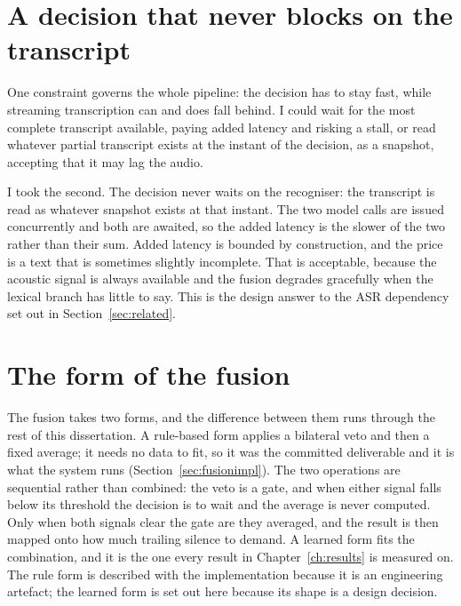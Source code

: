 \section{A decision that never blocks on the transcript}
\label{sec:nonblocking}

One constraint governs the whole pipeline: the decision has to stay fast, while streaming
transcription can and does fall behind. I could wait for the most complete transcript available, paying added latency and risking a
stall, or read whatever partial transcript exists at the instant of the decision, as a
snapshot, accepting that it may lag the audio.

I took the second. The decision never waits on the recogniser: the transcript is read as
whatever snapshot exists at that instant. The two model calls are issued concurrently and
both are awaited, so the added latency is the slower of the two rather than their sum. Added latency is bounded by construction,
and the price is a text that is sometimes slightly incomplete. That is acceptable, because the
acoustic signal is always available and the fusion degrades gracefully when the lexical
branch has little to say. This is the design answer to the ASR dependency set out in
Section~\ref{sec:related}.

\section{The form of the fusion}
\label{sec:fusionform}

The fusion takes two forms, and the difference between them runs through the rest of this
dissertation. A rule-based form applies a bilateral veto and then a fixed
average; it needs no data to fit, so it was the committed deliverable and it is what the
system runs (Section~\ref{sec:fusionimpl}). The two operations are sequential rather than
combined: the veto is a gate, and when either signal falls below its threshold the decision
is to wait and the average is never computed. Only when both signals clear the gate are
they averaged, and the result is then mapped onto how much trailing silence to demand. A learned form fits the combination, and it is
the one every result in Chapter~\ref{ch:results} is measured on. The rule form is described
with the implementation because it is an engineering artefact; the learned form is set out
here because its shape is a design decision.

